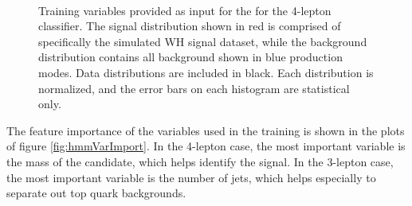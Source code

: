 {\begin{figure}[h!]
 \\
\caption{Training variables provided as input for the for the 4-lepton classifier. The signal distribution shown in red is comprised of specifically the simulated WH signal dataset, while the background distribution contains all background shown in blue production modes. Data distributions are included in black. Each distribution is normalized, and the error bars on each histogram are statistical only. }
\label{fig:hmm4lepVars}
\end{figure}
\clearpage
}




The feature importance of the variables used in the training is shown in the plots of figure \ref{fig:hmmVarImport}.
In the 4-lepton case, the most important variable is the mass of the \Z candidate, which helps identify the signal.
In the 3-lepton case, the most important variable is the number of jets, which helps especially to separate out top quark backgrounds.

